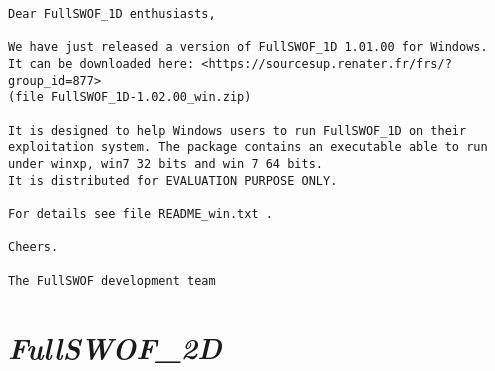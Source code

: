 \documentclass[a4paper, 11pt]{article}
\newcommand{\FullSWOFtwoD}{\emph{FullSWOF\_2D}}
\begin{document}
\begin{enumerate}
\begin{verbatim}
Dear FullSWOF_1D enthusiasts,

We have just released a version of FullSWOF_1D 1.01.00 for Windows.
It can be downloaded here: <https://sourcesup.renater.fr/frs/?group_id=877>
(file FullSWOF_1D-1.02.00_win.zip)

It is designed to help Windows users to run FullSWOF_1D on their 
exploitation system. The package contains an executable able to run  
under winxp, win7 32 bits and win 7 64 bits.
It is distributed for EVALUATION PURPOSE ONLY.

For details see file README_win.txt .

Cheers.

The FullSWOF development team 
\end{verbatim}
\end{enumerate}



\section{\FullSWOFtwoD{}}
\end{document}
